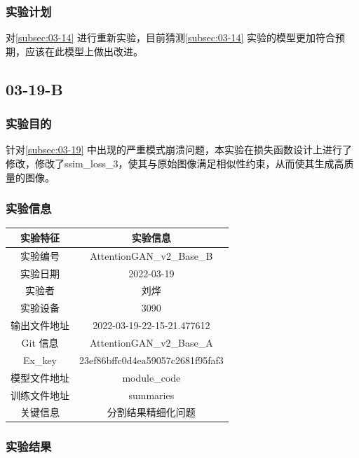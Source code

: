 \subsubsection{实验计划}

对\ref{subsec:03-14} 进行重新实验，目前猜测\ref{subsec:03-14} 实验的模型更加符合预期，应该在此模型上做出改进。

\newpage

\subsection{03-19-B}\label{subsec:03-19-b}

\subsubsection{实验目的}

针对\ref{subsec:03-19} 中出现的严重模式崩溃问题，本实验在损失函数设计上进行了修改，修改了ssim\_loss\_3，使其与原始图像满足相似性约束，从而使其生成高质量的图像。

\subsubsection{实验信息}


\begin{table}[H]
	\centering
	\begin{spacing}{1.5}
		\begin{tabular}{cc}\hline
			实验特征 & 实验信息 \\
			\hline
			实验编号 & AttentionGAN\_v2\_Base\_B\\
			实验日期 &  2022-03-19\\
			实验者 & 刘烨\\
			实验设备& 3090\\
			输出文件地址 & 2022-03-19-22-15-21.477612\\
			Git 信息 & AttentionGAN\_v2\_Base\_A\\
			Ex\_key & 23ef86bffc0d4ea59057c2681f95faf3\\
			模型文件地址 & module\_code\\
			训练文件地址 & summaries\\
			关键信息 & \colorbox{red!40}{分割结果精细化问题}\\\hline
		\end{tabular}
	\end{spacing}
\end{table}


\subsubsection{实验结果}

